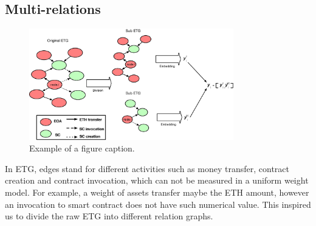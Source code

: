 \subsection{Multi-relations}
\label{sec:multi-relations}
\begin{figure}[htbp]
	\centering
	\label{fig_graph_split}
	\includegraphics[width=3.5in]{fig/graph_split.eps}
	\caption{Example of a figure caption.}


\end{figure}

In ETG, edges stand for different activities such as money transfer, contract creation and contract invocation, which can not be measured in a uniform weight model. For example, a weight of assets transfer maybe the ETH amount, however an invocation to smart contract does not have such numerical value. This inspired us to divide the raw ETG into different relation graphs.






